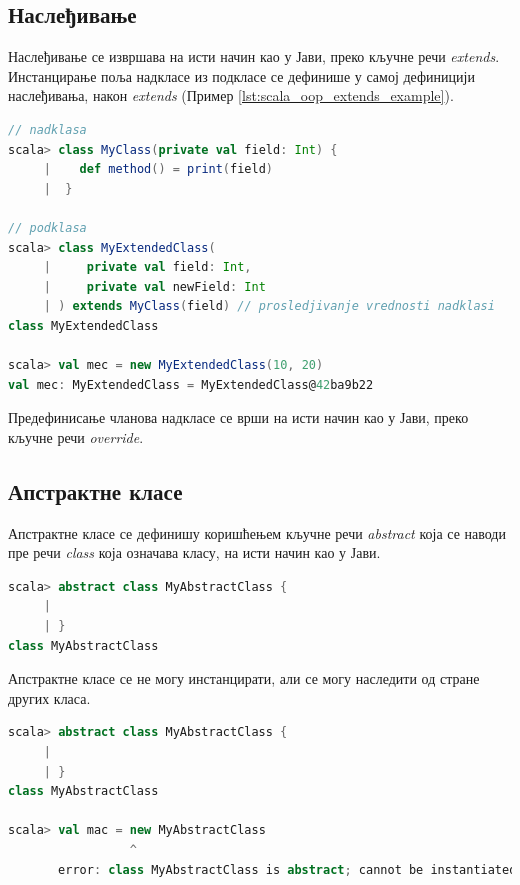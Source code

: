 \documentclass[12pt,oneside]{memoir}
\begin{document}
\subsection{Наслеђивање}
\label{subsec:scala_nasled}

Наслеђивање се извршава на исти начин као у Јави, преко кључне речи \textit{extends}. Инстанцирање поља надкласе из подкласе се дефинише у самој дефиницији наслеђивања, након \textit{extends} (Пример \ref{lst:scala_oop_extends_example}). \cite{scala_prog}

\begin{lstlisting}[language=Scala, caption={Наслеђивање у Скали}, label={lst:scala_oop_extends_example}]
// nadklasa
scala> class MyClass(private val field: Int) {
     |    def method() = print(field)
     |  }

// podklasa
scala> class MyExtendedClass(
     |     private val field: Int,
     |     private val newField: Int
     | ) extends MyClass(field) // prosledjivanje vrednosti nadklasi
class MyExtendedClass

scala> val mec = new MyExtendedClass(10, 20)
val mec: MyExtendedClass = MyExtendedClass@42ba9b22
\end{lstlisting}

Предефинисање чланова надкласе се врши на исти начин као у Јави, преко кључне речи \textit{override}.

\subsection{Апстрактне класе}
\label{subsec:scala_abs}

Апстрактне класе се дефинишу коришћењем кључне речи \textit{abstract} која се наводи пре речи \textit{class} која означава класу, на исти начин као у Јави. \cite{scala_prog}

\begin{lstlisting}[language=Scala, caption={Апстрактна класа у Скали}, label={lst:scala_oop_abstract_class_example}]
scala> abstract class MyAbstractClass {
     | 
     | }
class MyAbstractClass
\end{lstlisting}

Апстрактне класе се не могу инстанцирати, али се могу наследити од стране других класа.

\begin{lstlisting}[language=Scala, caption={Инстанцирање апстрактне класе}, label={lst:scala_oop_abstract_class_instance_example}]
scala> abstract class MyAbstractClass {
     | 
     | }
class MyAbstractClass

scala> val mac = new MyAbstractClass
                 ^
       error: class MyAbstractClass is abstract; cannot be instantiated
\end{lstlisting}
\end{document}
